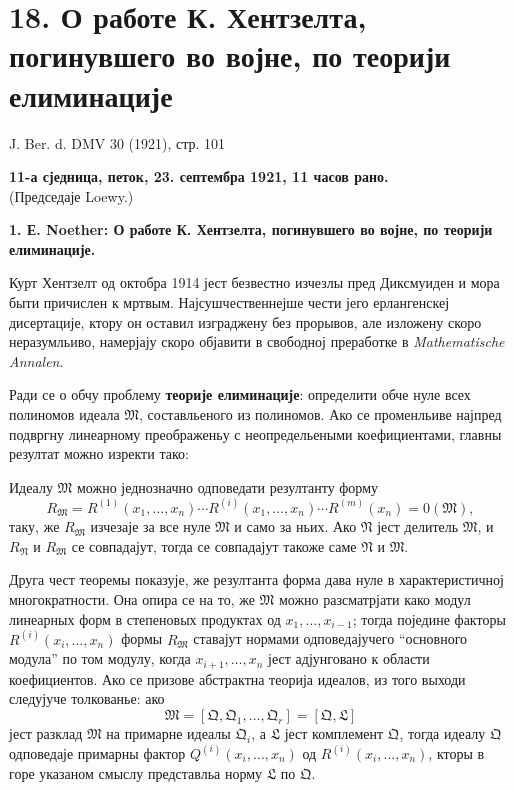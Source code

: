 ﻿\documentclass[11pt]{article}
\begin{document}

\setcounter{footnote}{0}
\section*{18. О работе К. Хентзелта, погинувшего во војне, по теорији елиминације}
\begin{center}
J. Ber. d. DMV 30 (1921), стр. 101
\end{center}

\begin{center}
\textbf{11-а сједница, петок, 23. септембра 1921, 11 часов рано.}\\
(Председаје Loewy.)
\end{center}

\textbf{1. Е. Noether: О работе К. Хентзелта, погинувшего во војне, по теорији елиминације.}

Курт Хентзелт од октобра 1914 јест безвестно изчезлы пред Диксмуиден и мора быти причислен к мртвым. Најсушчественнејше чести јего ерлангенскеј дисертације, ктору он оставил изграджену без прорывов, але изложену скоро неразумльиво, намерјају скоро објавити в свободној преработке в \emph{Mathematische Annalen}.

Ради се о обчу проблему \textbf{теорије елиминације}: определити обче нуле всех полиномов идеала \(\mathfrak M\), составльеного из полиномов. Ако се променльиве најпред подвргну линеарному преображеньу с неопредельеными коефициентами, главны резултат можно изректи тако:

Идеалу \(\mathfrak M\) можно једнозначно одповедати резултанту форму
\[
 R_{\mathfrak M}=R^{(1)}(x_1,
\ldots,x_n)\cdots R^{(i)}(x_1,
\ldots,x_n)\cdots R^{(m)}(x_n)=0(\mathfrak M),
\]
таку, же \(R_{\mathfrak M}\) изчезаје за все нуле \(\mathfrak M\) и само за ньих. Ако \(\mathfrak N\) јест делитель \(\mathfrak M\), и \(R_{\mathfrak N}\) и \(R_{\mathfrak M}\) се совпадајут, тогда се совпадајут такоже саме \(\mathfrak N\) и \(\mathfrak M\).

Друга чест теоремы показује, же резултанта форма дава нуле в характеристичној многократности. Она опира се на то, же \(\mathfrak M\) можно разсматрјати како модул линеарных форм в степеновых продуктах од \(x_1,
\ldots,x_{i-1}\); тогда поједине факторы \(R^{(i)}(x_i,
\ldots,x_n)\) формы \(R_{\mathfrak M}\) ставајут нормами одповедајучего ``основного модула'' по том модулу, когда \(x_{i+1},
\ldots,x_n\) јест адјунговано к области коефициентов. Ако се призове абстрактна теорија идеалов, из того выходи следујуче толкованье: ако
\[
 \mathfrak M=[\mathfrak Q,\mathfrak Q_1,
\ldots,
\mathfrak Q_r]=[\mathfrak Q,\mathfrak L]
\]
јест разклад \(\mathfrak M\) на примарне идеалы \(\mathfrak Q_i\), а \(\mathfrak L\) јест комплемент \(\mathfrak Q\), тогда идеалу \(\mathfrak Q\) одповедаје примарны фактор \(Q^{(i)}(x_i,
\ldots,x_n)\) од \(R^{(i)}(x_i,
\ldots,x_n)\), кторы в горе указаном смыслу представльа норму \(\mathfrak L\) по \(\mathfrak Q\).

\clearpage
\end{document}
